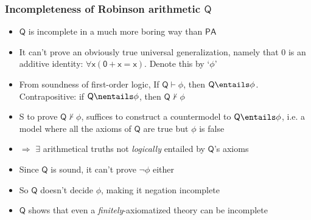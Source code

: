 \begin{frame}
\frametitle{Incompleteness of Robinson arithmetic $\mathsf{Q}$}

\begin{itemize}[<+->]

\item $\mathsf{Q}$ is incomplete in a much more boring way than $\mathsf{PA}$ %

\item It can't prove an obviously true universal generalization, namely that $0$ is an additive identity: $\mathsf{\forall x (0+x = x)}$. Denote this by `$\phi$' 

\item From soundness of first-order logic, If $\mathsf{Q} \vdash \phi$, then $\mathsf{Q} \entails \phi$. \\ Contrapositive: if $\mathsf{Q} \nentails \phi$, then $\mathsf{Q} \nvdash \phi$

\item S to prove $\mathsf{Q} \nvdash \phi$, suffices to construct a countermodel to $\mathsf{Q} \entails \phi$, i.e. a model where all the axioms of $\mathsf{Q}$ are true but $\phi$ is false 

\item[] $\Rightarrow$ $\exists$ arithmetical truths not \textit{logically} entailed by $\mathsf{Q}$'s axioms

\item Since $\mathsf{Q}$ is sound, it can't prove $\neg \phi$ either 

\item So $\mathsf{Q}$ doesn't decide $\phi$, making it negation incomplete 

\item $\mathsf{Q}$ shows that even a \textit{finitely}-axiomatized theory can be incomplete 

\end{itemize}
\end{frame}

